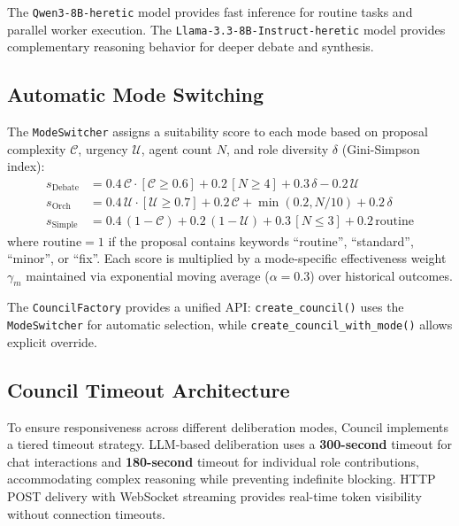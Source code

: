 \documentclass[11pt]{article}
\begin{document}
The \texttt{Qwen3-8B-heretic} model provides fast inference for routine tasks
and parallel worker execution. The \texttt{Llama-3.3-8B-Instruct-heretic}
model provides complementary reasoning behavior for deeper debate and synthesis.

\subsection{Automatic Mode Switching}

The \texttt{ModeSwitcher} assigns a suitability score to each mode based on
proposal complexity $\mathcal{C}$, urgency $\mathcal{U}$, agent count $N$, and
role diversity $\delta$ (Gini-Simpson index):
\begin{align}
  s_{\text{Debate}} &= 0.4\,\mathcal{C}\cdot[\mathcal{C} \geq 0.6]
                      + 0.2\,[N \geq 4]
                      + 0.3\,\delta
                      - 0.2\,\mathcal{U} \\
  s_{\text{Orch}}   &= 0.4\,\mathcal{U}\cdot[\mathcal{U} \geq 0.7]
                      + 0.2\,\mathcal{C}
                      + \min(0.2, N/10)
                      + 0.2\,\delta \\
  s_{\text{Simple}} &= 0.4\,(1-\mathcal{C})
                      + 0.2\,(1-\mathcal{U})
                      + 0.3\,[N \leq 3]
                      + 0.2\,\text{routine}
\end{align}
where $\text{routine} = 1$ if the proposal contains keywords
``routine'', ``standard'', ``minor'', or ``fix''. Each score is multiplied by
a mode-specific effectiveness weight $\gamma_m$ maintained via exponential
moving average ($\alpha = 0.3$) over historical outcomes.

The \texttt{CouncilFactory} provides a unified API: \texttt{create\_council()}
uses the \texttt{ModeSwitcher} for automatic selection, while
\texttt{create\_council\_with\_mode()} allows explicit override.

\subsection{Council Timeout Architecture}

To ensure responsiveness across different deliberation modes, Council implements
a tiered timeout strategy. LLM-based deliberation uses a \textbf{300-second}
timeout for chat interactions and \textbf{180-second} timeout for individual
role contributions, accommodating complex reasoning while preventing indefinite
blocking. HTTP POST delivery with WebSocket streaming provides real-time token
visibility without connection timeouts.
\end{document}
